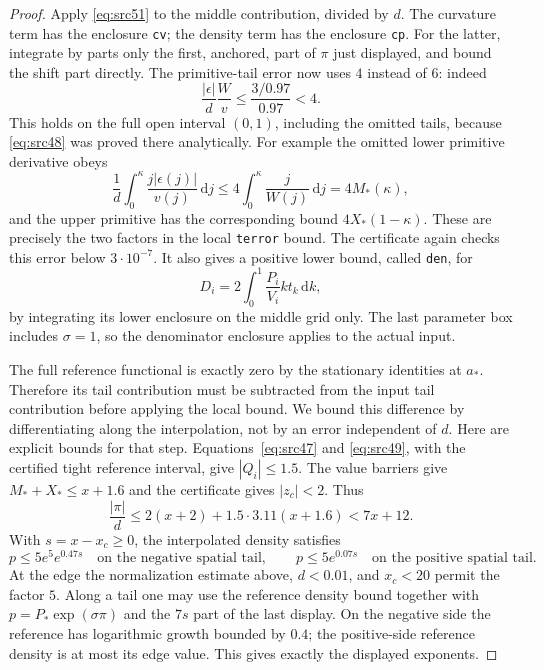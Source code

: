 \documentclass[11pt,a4paper]{article}
\numberwithin{equation}{section}
\theoremstyle{definition}
\theoremstyle{remark}
\newcommand{\dd}{\mathrm d}
\begin{document}
\begin{proof}
Apply \eqref{eq:src51} to the middle contribution, divided by $d$.
The curvature term has the enclosure \texttt{cv}; the density term
has the enclosure \texttt{cp}.  For the latter, integrate by parts
only the first, anchored, part of $\pi$ just displayed, and bound the
shift part directly.  The primitive-tail error now uses $4$ instead
of $6$: indeed
\[
 \frac{|\epsilon|}{d}\frac{W}{v}
 \le\frac{3/0.97}{0.97}<4.
\]
This holds on the full open interval $(0,1)$, including the omitted
tails, because \eqref{eq:src48} was proved there analytically.
For example the omitted lower primitive derivative obeys
\[
 \frac1d\int_0^\kappa\frac{j|\epsilon(j)|}{v(j)}\,\dd j
 \le4\int_0^\kappa\frac j{W(j)}\,\dd j=4M_*(\kappa),
\]
and the upper primitive has the corresponding bound
$4X_*(1-\kappa)$.  These are precisely the two factors in the
local \texttt{terror} bound.
The certificate again checks this error below $3\cdot10^{-7}$.
It also gives a positive lower bound, called \texttt{den}, for
\[
 D_i=2\int_0^1\frac{P_i}{V_i}kt_k\,\dd k,
\]
by integrating its lower enclosure on the middle grid only.  The last
parameter box includes $\sigma=1$, so the denominator enclosure
applies to the actual input.

The full reference functional is exactly zero by the stationary
identities at $a_*$.  Therefore its tail contribution must be
subtracted from the input tail contribution before applying the
local bound.  We bound this difference by differentiating along the
interpolation, not by an error independent of $d$.  Here are explicit
bounds for that step.  Equations~\eqref{eq:src47} and
\eqref{eq:src49}, with the certified tight reference interval, give
$|Q_i|\le1.5$.  The value barriers give
$M_*+X_*\le x+1.6$ and the certificate gives $|z_c|<2$.  Thus
\[
 \frac{|\pi|}{d}\le2(x+2)+1.5\cdot3.11(x+1.6)<7x+12.
\]
With $s=x-x_c\ge0$, the interpolated density satisfies
\[
 p\le5e^5e^{0.47s}\quad\text{on the negative spatial tail},
 \qquad p\le5e^{0.07s}\quad\text{on the positive spatial tail}.
\]
At the edge the normalization estimate above, $d<0.01$, and
$x_c<20$ permit the factor $5$.  Along a tail one may use the
reference density bound together with
$p=P_*\exp(\sigma\pi)$ and the $7s$ part of the last display.
On the negative side the reference has logarithmic growth bounded
by $0.4$; the positive-side reference density is at most its edge
value.  This gives exactly the displayed exponents.


\end{proof}
\end{document}
